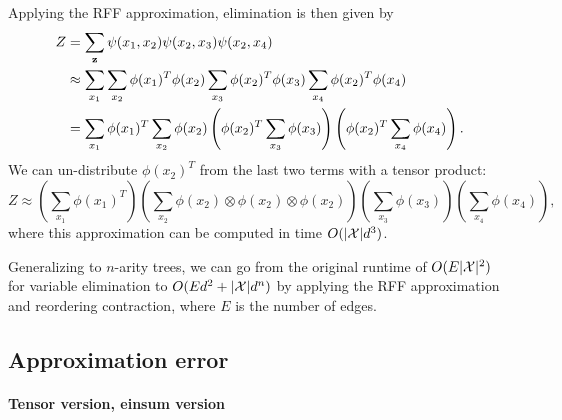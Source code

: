 \documentclass{article}
\begin{document}
Applying the RFF approximation, elimination is then given by
\begin{equation}
\label{eqn:star}
\begin{aligned}
Z &= \sum_{\mathbf{z}} \psi(x_1, x_2) \psi(x_2, x_3) \psi(x_2, x_4) \\
&\approx \sum_{x_1} \sum_{x_2} \phi(x_1)^T\phi(x_2)
    \sum_{x_3} \phi(x_2)^T\phi(x_3) \sum_{x_4} \phi(x_2)^T\phi(x_4)\\
&= \sum_{x_1} \phi(x_1)^T \sum_{x_2} \phi(x_2)
    \left(\phi(x_2)^T \sum_{x_3} \phi(x_3)\right)
    \left(\phi(x_2)^T\sum_{x_4} \phi(x_4)\right).
\end{aligned}
\end{equation}
We can un-distribute $\phi(x_2)^T$ from the last two terms with a tensor product:
\begin{equation}
Z \approx \left(\sum_{x_1} \phi(x_1)^T \right)
\left(\sum_{x_2} \phi(x_2) \otimes\phi(x_2) \otimes \phi(x_2)  \right)
\left(\sum_{x_3} \phi(x_3)\right) 
\left(\sum_{x_4} \phi(x_4)\right),
\end{equation}
where this approximation can be computed in time $O(|\mathcal{X}|d^3)$.

Generalizing to $n$-arity trees, we can go from the original runtime of $O(E|\mathcal{X}|^2)$
for variable elimination to $O(Ed^2 + |\mathcal{X}|d^n)$ by applying the
RFF approximation and reordering contraction, where $E$ is the number of edges.

\subsection{Approximation error}

\paragraph{Tensor version, einsum version}
\end{document}
